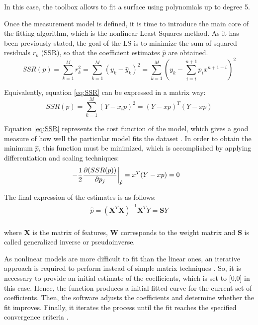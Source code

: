 \documentclass[a4paper, report, oneside, UKenglish]{memoir}
\begin{document}
In this case, the toolbox allows to fit a surface using polynomials up to degree 5. 

Once the measurement model is defined, it is time to introduce the main core of the fitting algorithm, which is the nonlinear Least Squares method. As it has been previously stated, the goal of the LS is to minimize the sum of squared residuals $r_k$ (SSR), so that the coefficient estimates $\hat{p}$ are obtained.
\begin{equation}\label{eq:SSR}
    SSR(p) = \sum\limits_{k=1}^{M}{r}_{k}^{2} = \sum\limits_{k=1}^{M}(y_k - \hat{y}_k)^2 = \sum\limits_{k=1}^{M}(y_k - \sum\limits_{i=i}^{n+1} p_{i}x^{n+1-i})^2
\end{equation}

Equivalently, equation \eqref{eq:SSR} can be expressed in a matrix way:
\begin{equation}
    SSR(p) = \sum\limits_{k=1}^{M}(Y - x_{i}p)^2 = (Y - xp)^T(Y - xp)
\end{equation}

Equation \eqref{eq:SSR} represents the cost function of the model, which gives a good measure of how well the particular model fits the dataset \cite{MachLearnRefined}. In order to obtain the minimum $\hat{p}$, this function must be minimized, which is accomplished by applying differentiation and scaling techniques:
\begin{equation}
\begin{split}
    \left.-\frac{1}{2}\pdv{(SSR(p))}{p_{j}}\right|_{\substack{\hat{p}}} &= x^{T}(Y - xp) = 0
\end{split}
\end{equation}

The final expression of the estimates is as follows:
\begin{equation}\label{eq:estimatorLS}
\begin{split}
    \hat{p} = (\textbf{X}^{T}\textbf{X})^{-1}\textbf{X}^{T}Y = \textbf{S}Y\\
\end{split}
\end{equation}

where $\textbf{X}$ is the matrix of features, $\textbf{W}$ corresponds to the weight matrix and $\textbf{S}$ is called generalized inverse or pseudoinverse.

As nonlinear models are more difficult to fit than the linear ones, an iterative approach is required to perform instead of simple matrix techniques \cite{MathWorksRegression}. So, it is necessary to provide an initial estimate of the coefficients, which is set to [0,0] in this case. Hence, the function produces a initial fitted curve for the current set of coefficients. Then, the software adjusts the coefficients and determine whether the fit improves. Finally, it iterates the process until the fit reaches the specified convergence criteria \cite{MathWorksRegression}. 
\end{document}
